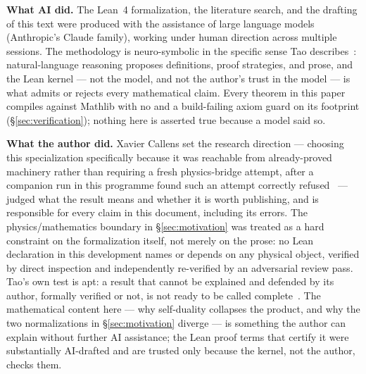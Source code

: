 \documentclass[11pt, a4paper]{article}
\newcommand{\lean}[1]{\ifmmode\text{\ttfamily\detokenize{#1}}\else{\ttfamily\detokenize{#1}}\fi}
\theoremstyle{remark}
\begin{document}
\textbf{What AI did.} The Lean~4 formalization, the literature search, and the drafting of this
text were produced with the assistance of large language models (Anthropic's Claude family),
working under human direction across multiple sessions. The methodology is neuro-symbolic in the
specific sense Tao describes~\cite{Tao2026AI}: natural-language reasoning proposes definitions,
proof strategies, and prose, and the Lean kernel --- not the model, and not the author's trust in
the model --- is what admits or rejects every mathematical claim. Every theorem in this paper
compiles against Mathlib with no \lean{sorry} and a build-failing axiom guard on its footprint
(\S\ref{sec:verification}); nothing here is asserted true because a model said so.

\textbf{What the author did.} Xavier Callens set the research direction --- choosing this
specialization specifically because it was reachable from already-proved machinery rather than
requiring a fresh physics-bridge attempt, after a companion run in this programme found such an
attempt correctly refused~\cite{Fricke2026} --- judged what the result means and whether it is
worth publishing, and is responsible for every claim in this document, including its errors. The
physics/mathematics boundary in \S\ref{sec:motivation} was treated as a hard constraint on the
formalization itself, not merely on the prose: no Lean declaration in this development names or
depends on any physical object, verified by direct inspection and independently re-verified by an
adversarial review pass. Tao's own test is apt: a result that cannot be explained and defended by
its author, formally verified or not, is not ready to be called complete~\cite{Tao2026AI}. The
mathematical content here --- why self-duality collapses the product, and why the two
normalizations in \S\ref{sec:motivation} diverge --- is something the author can explain without
further AI assistance; the Lean proof terms that certify it were substantially AI-drafted and are
trusted only because the kernel, not the author, checks them.
\end{document}
